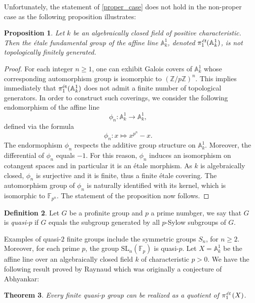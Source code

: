 \documentclass[10pt,a4paper]{amsart}
\numberwithin{equation}{subsection}
\theoremstyle{plain}
\newtheorem{theorem}{Theorem}[section]
\newtheorem{prop}[theorem]{Proposition}
\theoremstyle{definition}
\newtheorem{defi}[theorem]{Definition}
\theoremstyle{remark}
\numberwithin{equation}{section}
\begin{document}
Unfortunately, the statement of \cref{proper_case} does not hold in the non-proper case as the following proposition illustrates:

\begin{prop}
Let $k$ be an algebraically closed field of positive characteristic. Then the \'etale fundamental group of the affine line $\mathbb A^1_k$, denoted $\pi_1^\emph{\text{\'et}}(\mathbb A^1_k)$, is not topologically finitely generated.
\end{prop}

\begin{proof}
For each integer $n \geq 1$, one can exhibit Galois covers of $\mathbb A^1_k$ whose corresponding automorphism group is isomorphic to $\left( \mathbb Z / p \mathbb Z \right)^n$. This implies immediately that $\pi_1^{\text{\'et}}(\mathbb A^1_k)$ does not admit a finite
number of
topological generators. In order to construct such coverings, we consider the following endomorphism of the affine line
	\[
		\phi_n \colon \mathbb A^1_k \to \mathbb A^1_k,
	\]
defined via the formula
	\[
		\phi_n \colon x \Mapsto x^{p^n} - x.
	\] 
The endormophism $\phi_n$ respects the additive group structure on $\mathbb A^1_k$. Moreover,
the differential of $\phi_n$ equals $-1$. For this reason, $\phi_n$ induces an isomorphism on cotangent spaces and in particular it is an \'etale morphism.
As $k$ is algebraically closed, $\phi_n$ is surjective and it is finite, thus a finite \'etale covering. The automorphism group
of
$\phi_n$ is naturally
identified with its kernel, which is isomorphic to $\mathbb F_{p^n}$. The statement of the proposition now follows.
\end{proof}

\begin{defi}
Let $G$ be a profinite group and $p$ a prime numbger, we say that $G$ is \emph{quasi-$p$} if $G$ equals the subgroup generated by all $p$-Sylow subgroups of $G$.
\end{defi}

Examples of quasi-$2$ finite groups include the symmetric groups $S_n$, for $n \geq 2$. Moreover, for each prime $p$, the group $\mathrm{SL}_n(\mathbb F_p)$ is quasi-$p$.
Let $X = \mathbb A^1_k$ be the affine line over an algebraically closed field $k$ of characteristic $p>0$. 
We have the following result proved by Raynaud which was originally a conjecture of Abhyankar:

\begin{theorem}{\cite[Conjecture 10]{Clark}} 
Every finite quasi-$p$ group can be realized as a quotient of $\pi_1^{\emph{\text{\'et}}} \left(X \right)$.
\end{theorem}
\end{document}
